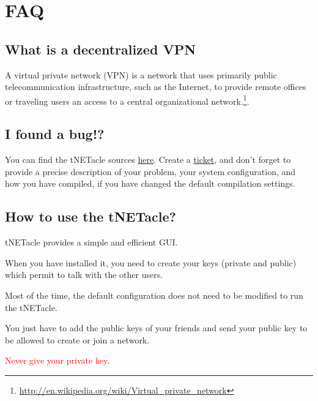 ﻿\section{FAQ}
\subsection{What is a decentralized VPN}
A virtual private network (VPN) is a network that uses primarily public telecommunication infrastructure, such as the Internet, to provide remote offices or traveling users an access to a central organizational network.\footnote{\url{http://en.wikipedia.org/wiki/Virtual\_private\_network}}.

\subsection{I found a bug!?}

You can find the tNETacle sources \href{https://github.com/LaKabane/tNETacle}{here}.
Create a \href{https://github.com/LaKabane/tNETacle/issues/new}{ticket}, and don't forget to provide a precise description of your problem, your system configuration, and how you have compiled, if you have changed the default compilation settings.

\subsection{How to use the tNETacle?}
tNETacle provides a simple and efficient GUI.

When you have installed it, you need to create your keys (private and public) which permit to talk with the other users.

Most of the time, the default configuration does not need to be modified to run the tNETacle.

You just have to add the public keys of your friends and send your public key to be allowed to create or join a network.

\textcolor{red}{Never give your private key}.

